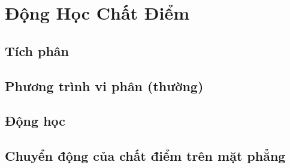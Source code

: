   
\chapter{Động Học Chất Điểm }


\section{Tích phân}

\section{Phương trình vi phân (thường)}
\section{Động học}

\section{Chuyển động của chất điểm trên mặt phẳng}
